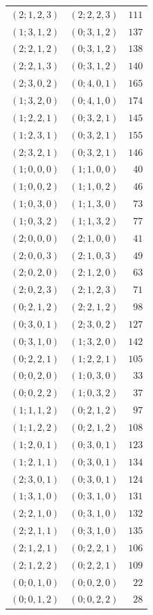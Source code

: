 \begin{longtable}{@{}rrr@{}}
$(2;1,2,3)$ & $(2;2,2,3)$ & $111$\\
$(1;3,1,2)$ & $(0;3,1,2)$ & $137$\\
$(2;2,1,2)$ & $(0;3,1,2)$ & $138$\\
$(2;2,1,3)$ & $(0;3,1,2)$ & $140$\\
$(2;3,0,2)$ & $(0;4,0,1)$ & $165$\\
$(1;3,2,0)$ & $(0;4,1,0)$ & $174$\\
$(1;2,2,1)$ & $(0;3,2,1)$ & $145$\\
$(1;2,3,1)$ & $(0;3,2,1)$ & $155$\\
$(2;3,2,1)$ & $(0;3,2,1)$ & $146$\\
$(1;0,0,0)$ & $(1;1,0,0)$ & $40$\\
$(1;0,0,2)$ & $(1;1,0,2)$ & $46$\\
$(1;0,3,0)$ & $(1;1,3,0)$ & $73$\\
$(1;0,3,2)$ & $(1;1,3,2)$ & $77$\\
$(2;0,0,0)$ & $(2;1,0,0)$ & $41$\\
$(2;0,0,3)$ & $(2;1,0,3)$ & $49$\\
$(2;0,2,0)$ & $(2;1,2,0)$ & $63$\\
$(2;0,2,3)$ & $(2;1,2,3)$ & $71$\\
$(0;2,1,2)$ & $(2;2,1,2)$ & $98$\\
$(0;3,0,1)$ & $(2;3,0,2)$ & $127$\\
$(0;3,1,0)$ & $(1;3,2,0)$ & $142$\\
$(0;2,2,1)$ & $(1;2,2,1)$ & $105$\\
$(0;0,2,0)$ & $(1;0,3,0)$ & $33$\\
$(0;0,2,2)$ & $(1;0,3,2)$ & $37$\\
$(1;1,1,2)$ & $(0;2,1,2)$ & $97$\\
$(1;1,2,2)$ & $(0;2,1,2)$ & $108$\\
$(1;2,0,1)$ & $(0;3,0,1)$ & $123$\\
$(1;2,1,1)$ & $(0;3,0,1)$ & $134$\\
$(2;3,0,1)$ & $(0;3,0,1)$ & $124$\\
$(1;3,1,0)$ & $(0;3,1,0)$ & $131$\\
$(2;2,1,0)$ & $(0;3,1,0)$ & $132$\\
$(2;2,1,1)$ & $(0;3,1,0)$ & $135$\\
$(2;1,2,1)$ & $(0;2,2,1)$ & $106$\\
$(2;1,2,2)$ & $(0;2,2,1)$ & $109$\\
$(0;0,1,0)$ & $(0;0,2,0)$ & $22$\\
$(0;0,1,2)$ & $(0;0,2,2)$ & $28$\\

\end{longtable}
